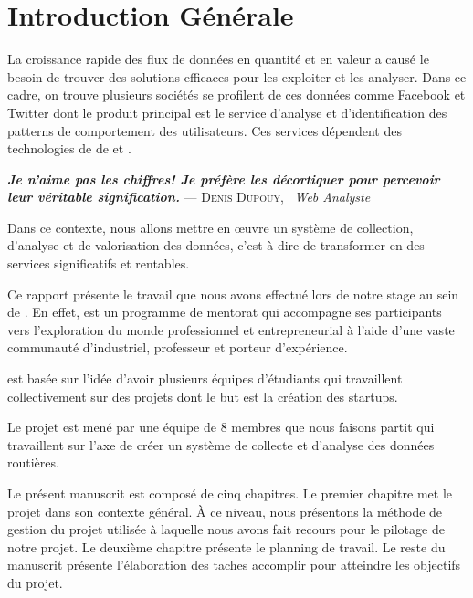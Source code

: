 \chapter*{Introduction Générale}

La croissance rapide des flux de données en quantité et en valeur a causé le
besoin de trouver des solutions efficaces pour les exploiter et les analyser.
Dans ce cadre, on trouve plusieurs sociétés se profilent de ces données comme
Facebook et Twitter dont le produit principal est le service d'analyse et
d'identification des patterns de comportement des utilisateurs. Ces services
dépendent des technologies de de  et .


\begin{center}
\textbf{\textit{Je n’aime pas les chiffres! Je préfère les décortiquer pour
percevoir leur véritable signification.}} \linebreak
\hfill --- \textsc{Denis Dupouy}, \ \textit{Web Analyste}
\end{center}

Dans ce contexte, nous allons mettre en \oe{}uvre un système de collection,
d'analyse et de valorisation des données, c'est à dire de transformer en des
services significatifs et rentables.

Ce rapport présente le travail que nous avons effectué lors de notre stage au
sein de . En effet,  est
un programme de mentorat qui accompagne ses participants vers l'exploration du
monde professionnel et entrepreneurial à l'aide d'une vaste communauté
d'industriel, professeur et porteur d'expérience.

 est basée sur l'idée d'avoir plusieurs équipes
d'étudiants qui travaillent collectivement sur des projets dont le but est la
création des startups.

Le projet  est mené par une équipe de 8 membres que nous
faisons partit qui travaillent sur l'axe de créer un système de collecte et
d'analyse des données routières.

Le présent manuscrit est composé de cinq chapitres. Le premier chapitre met le
projet dans son contexte général. À ce niveau, nous présentons la méthode de
gestion du projet utilisée à laquelle nous avons fait recours pour le pilotage
de notre projet. Le deuxième chapitre présente le planning de travail.  Le
reste du manuscrit présente l'élaboration des taches accomplir pour atteindre
les objectifs du projet.
